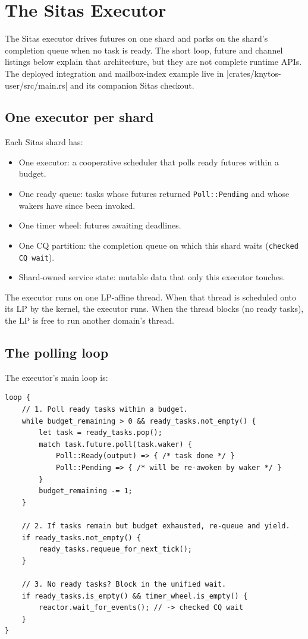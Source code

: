 \chapter{The Sitas Executor}
\label{chap:sitas-executor}

The Sitas executor drives futures on one shard and parks on the shard's completion
queue when no task is ready. The short loop, future and channel listings below
explain that architecture, but they are not complete runtime APIs. The deployed
integration and mailbox-index example live in
\repofile|crates/knytos-user/src/main.rs| and its companion Sitas checkout.

\section{One executor per shard}

Each Sitas shard has:

\begin{itemize}
    \item One executor: a cooperative scheduler that polls ready
        futures within a budget.
    \item One ready queue: tasks whose futures returned
        \texttt{Poll::Pending} and whose wakers have since been invoked.
    \item One timer wheel: futures awaiting deadlines.
    \item One CQ partition: the completion queue on which this shard
        waits (\texttt{checked CQ wait}).
    \item Shard-owned service state: mutable data that only this
        executor touches.
\end{itemize}

The executor runs on one LP-affine thread. When that thread is scheduled onto its
LP by the kernel, the executor runs. When the thread blocks (no ready tasks), the
LP is free to run another domain's thread.

\section{The polling loop}

The executor's main loop is:

\begin{lstlisting}[style=rustCode]
loop {
    // 1. Poll ready tasks within a budget.
    while budget_remaining > 0 && ready_tasks.not_empty() {
        let task = ready_tasks.pop();
        match task.future.poll(task.waker) {
            Poll::Ready(output) => { /* task done */ }
            Poll::Pending => { /* will be re-awoken by waker */ }
        }
        budget_remaining -= 1;
    }

    // 2. If tasks remain but budget exhausted, re-queue and yield.
    if ready_tasks.not_empty() {
        ready_tasks.requeue_for_next_tick();
    }

    // 3. No ready tasks? Block in the unified wait.
    if ready_tasks.is_empty() && timer_wheel.is_empty() {
        reactor.wait_for_events(); // -> checked CQ wait
    }
}
\end{lstlisting}

